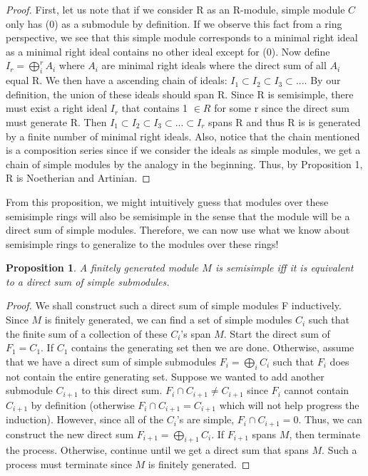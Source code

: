 \documentclass[11pt]{article}
\newtheorem{proposition}{Proposition}
\begin{document}
\noindent
\begin{proof} First, let us note that if we consider R as an R-module, simple module $C$ only has (0) as a submodule by definition. If we observe this fact from a ring perspective, we see that this simple module corresponds to a minimal right ideal as a minimal right ideal contains no other ideal except for (0). Now define $I_r = \bigoplus_i^{r} A_i$ where $A_i$ are minimal right ideals where the direct sum of all $A_i$ equal R. We then have a ascending chain of ideals: $I_1 \subset I_2 \subset I_3 \subset ...$. By our definition, the union of these ideals should span R. Since R is semisimple, there must exist a right ideal $I_r $ that contains 1 $\in R$ for some r since the direct sum must generate R. 
Then $I_1\subset I_2 \subset I_3 \subset ... \subset I_r$ spans R and thus R is is generated by a finite number of minimal right ideals.
Also, notice that the chain mentioned is a composition series since if we consider the ideals as simple modules, we get a chain of simple modules by the analogy in the beginning. Thus, by Proposition 1, R is Noetherian and Artinian. \end{proof}

From this proposition, we might intuitively guess that modules over these semisimple rings will also be semisimple in the sense that the module will be a direct sum of simple modules. Therefore, we can now use what we know about semisimple rings to generalize to the modules over these rings!

\noindent
\begin{proposition} A finitely generated module $M$ is semisimple iff it is equivalent to a direct sum of simple submodules. \end{proposition}

\noindent
\begin{proof} We shall construct such a direct sum of simple modules F inductively. Since $M$ is finitely generated, we can find a set of simple modules $C_i$ such that the finite sum of a collection of these $C_i$'s span $M$. Start the direct sum of $F_1 = C_1$. If $C_1$ contains the generating set then we are done. Otherwise, assume that we have a direct sum of simple submodules $F_i = \bigoplus_i C_i$ such that $F_i$ does not contain the entire generating set. Suppose we wanted to add another submodule $C_{i+1}$ to this direct sum. $F_i \cap C_{i+1} \neq C_{i+1}$ since $F_i$ cannot contain $C_{i+1}$ by definition (otherwise $F_i \cap C_{i+1} = C_{i+1}$ which will not help progress the induction). However, since all of the 
$C_i$'s are simple, $F_i \cap C_{i+1} = 0$. Thus, we can construct the new direct sum $F_{i+1} =  \bigoplus_{i+1} C_i$. If $F_{i+1}$ spans $M$, then terminate the process. Otherwise, continue until we get a direct sum that spans $M$. Such a process must terminate since
$M$ is finitely generated.\end{proof}
\end{document}
